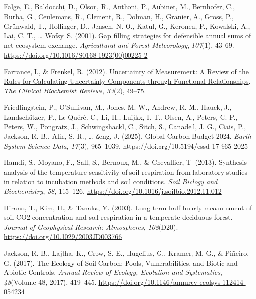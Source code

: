 \documentclass[
  letterpaper,
  DIV=11,
  numbers=noendperiod]{scrartcl}
\newlength{\cslhangindent}
\newenvironment{CSLReferences}[2] %
 {\begin{list}{}{%
  \setlength{\itemindent}{0pt}
  \setlength{\leftmargin}{0pt}
  \setlength{\parsep}{0pt}
  \ifodd #1
   \setlength{\leftmargin}{\cslhangindent}
   \setlength{\itemindent}{-1\cslhangindent}
  \fi
  \setlength{\itemsep}{#2\baselineskip}}}
 {\end{list}}
\begin{document}
\begin{CSLReferences}{1}{0}
Falge, E., Baldocchi, D., Olson, R., Anthoni, P., Aubinet, M.,
Bernhofer, C., Burba, G., Ceulemans, R., Clement, R., Dolman, H.,
Granier, A., Gross, P., Grünwald, T., Hollinger, D., Jensen, N.-O.,
Katul, G., Keronen, P., Kowalski, A., Lai, C. T., \ldots{} Wofsy, S.
(2001). Gap filling strategies for defensible annual sums of net
ecosystem exchange. \emph{Agricultural and Forest Meteorology},
\emph{107}(1), 43--69.
\url{https://doi.org/10.1016/S0168-1923(00)00225-2}

Farrance, I., \& Frenkel, R. (2012).
\href{https://www.ncbi.nlm.nih.gov/pmc/articles/PMC3387884}{Uncertainty
of {Measurement}: {A Review} of the {Rules} for {Calculating Uncertainty
Components} through {Functional Relationships}}. \emph{The Clinical
Biochemist Reviews}, \emph{33}(2), 49--75.

Friedlingstein, P., O'Sullivan, M., Jones, M. W., Andrew, R. M., Hauck,
J., Landschützer, P., Le Quéré, C., Li, H., Luijkx, I. T., Olsen, A.,
Peters, G. P., Peters, W., Pongratz, J., Schwingshackl, C., Sitch, S.,
Canadell, J. G., Ciais, P., Jackson, R. B., Alin, S. R., \ldots{} Zeng,
J. (2025). Global {Carbon Budget} 2024. \emph{Earth System Science
Data}, \emph{17}(3), 965--1039.
\url{https://doi.org/10.5194/essd-17-965-2025}

Hamdi, S., Moyano, F., Sall, S., Bernoux, M., \& Chevallier, T. (2013).
Synthesis analysis of the temperature sensitivity of soil respiration
from laboratory studies in relation to incubation methods and soil
conditions. \emph{Soil Biology and Biochemistry}, \emph{58}, 115--126.
\url{https://doi.org/10.1016/j.soilbio.2012.11.012}

Hirano, T., Kim, H., \& Tanaka, Y. (2003). Long-term half-hourly
measurement of soil {CO2} concentration and soil respiration in a
temperate deciduous forest. \emph{Journal of Geophysical Research:
Atmospheres}, \emph{108}(D20).
\url{https://doi.org/10.1029/2003JD003766}

Jackson, R. B., Lajtha, K., Crow, S. E., Hugelius, G., Kramer, M. G., \&
Piñeiro, G. (2017). The {Ecology} of {Soil Carbon}: {Pools},
{Vulnerabilities}, and {Biotic} and {Abiotic Controls}. \emph{Annual
Review of Ecology, Evolution and Systematics}, \emph{48}(Volume 48,
2017), 419--445.
\url{https://doi.org/10.1146/annurev-ecolsys-112414-054234}


\end{CSLReferences}
\end{document}
